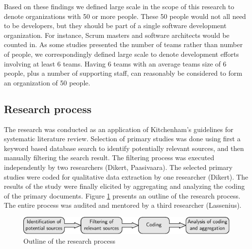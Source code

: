 Based on these findings we defined large scale in the scope of this research to
denote organizations with 50 or more people. These 50 people would not all need
to be developers, but they should be part of a single software development
organization. For instance, Scrum masters and software architects would be
counted in. As some studies presented the number of teams rather than number of
people, we correspondingly defined large scale to denote development efforts
involving at least 6 teams. Having 6 teams with an average teams size of 6
people, plus a number of supporting staff, can reasonably be considered to form
an organization of 50 people.


% 



\subsection{Research process}

The research was conducted as an application of Kitchenham's
\cite{Kitchenham2007} guidelines for systematic literature review. Selection of
primary studies was done using first a keyword based database search to identify
potentially relevant sources, and then manually filtering the search result. The
filtering process was executed independently by two researchers (Dikert,
Paasivaara). The selected primary studies were coded for qualitative data
extraction by one researcher (Dikert). The results of the study were finally
elicited by aggregating and analyzing the coding of the primary documents.
Figure \ref{fig:researchprocess} presents an outline of the research process.
The entire process was audited and mentored by a third researcher (Lassenius).

\begin{figure}[b]
  \begin{center}
    \includegraphics{graphics/research_process.pdf}
    \caption{Outline of the research process}
    \label{fig:researchprocess}
  \end{center}
\end{figure}

